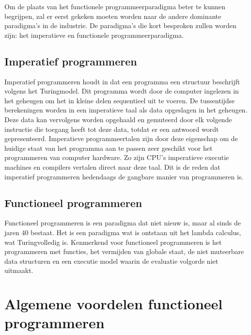\documentclass[twoside,twocolumn]{article}
\begin{document}
Om de plaats van het functionele programmeerparadigma beter te kunnen
begrijpen, zal er eerst gekeken moeten worden naar de andere dominante
paradigma's in de industrie. De paradigma's die kort besproken zullen worden
zijn: het imperatieve en functionele programmeerparadigma.


\subsection{Imperatief programmeren}
Imperatief programmeren houdt in dat een programma een structuur beschrijft
volgens het Turingmodel. Dit programma wordt door de computer ingelezen in het
geheugen om het in kleine delen sequentieel uit te voeren. De tussentijdse
berekeningen worden in een imperatieve taal als data opgeslagen in het
geheugen. Deze data kan vervolgens worden opgehaald en gemuteerd door elk
volgende instructie die toegang heeft tot deze data, totdat er een antwoord
wordt gepresenteerd. Imperatieve programmeertalen zijn door deze eigenschap om
de huidige staat van het programma aan te passen zeer geschikt voor het
programmeren van computer hardware. Zo zijn CPU's imperatieve executie machines
en compilers vertalen direct naar deze taal. Dit is de reden dat imperatief
programmeren hedendaags de gangbare manier van programmeren is.

\subsection{Functioneel programmeren }
Functioneel programmeren is een paradigma dat niet nieuw is, maar al sinds de
jaren 40 bestaat. Het is een paradigma wat is ontstaan uit het
lambda calculus, wat Turingvolledig is. Kenmerkend voor functioneel
programmeren is het programmeren met functies, het vermijden van globale staat,
de niet muteerbare data structuren en een executie model waarin de evaluatie
volgorde niet uitmaakt.


\section{Algemene voordelen functioneel programmeren}
\end{document}
